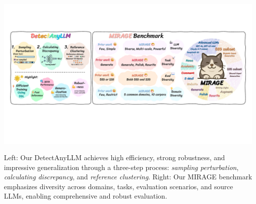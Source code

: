 \documentclass[sigconf]{acmart}
\begin{document}
\begin{teaserfigure}
  \centering
  \includegraphics[width=\textwidth]{fig/teaser.pdf}
  \caption{Left: Our DetectAnyLLM achieves high efficiency, strong robustness, and impressive generalization through a three-step process: \textit{sampling perturbation}, \textit{calculating discrepancy}, and \textit{reference clustering}. Right: Our MIRAGE benchmark emphasizes diversity across domains, tasks, evaluation scenarios, and source LLMs, enabling comprehensive and robust evaluation.}
  \label{fig:teaser}
\end{teaserfigure}

\maketitle








\clearpage


\end{document}
